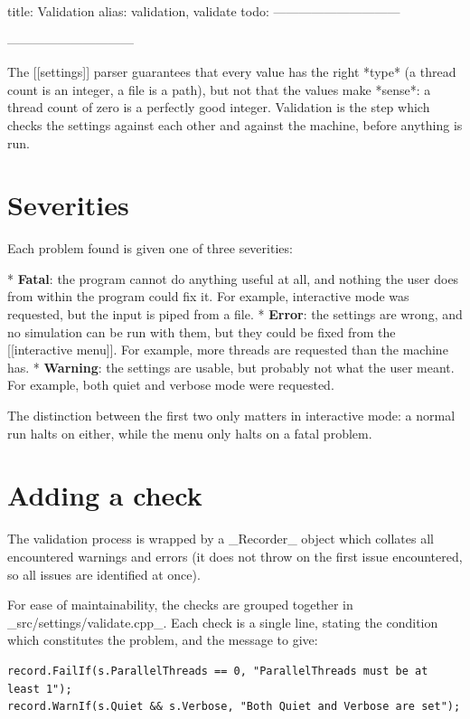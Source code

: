 title: Validation
alias: validation, validate
todo:
------------------------------
\usepackage{listings}
------------------------------

The [[settings]] parser guarantees that every value has the right *type* (a thread count is an integer, a file is a path), but not that the values make *sense*: a thread count of zero is a perfectly good integer. Validation is the step which checks the settings against each other and against the machine, before anything is run.

\section{Severities}

	Each problem found is given one of three severities:

	* \textbf{Fatal}: the program cannot do anything useful at all, and nothing the user does from within the program could fix it. For example, interactive mode was requested, but the input is piped from a file.
	* \textbf{Error}: the settings are wrong, and no simulation can be run with them, but they could be fixed from the [[interactive menu]]. For example, more threads are requested than the machine has.
	* \textbf{Warning}: the settings are usable, but probably not what the user meant. For example, both quiet and verbose mode were requested.

	The distinction between the first two only matters in interactive mode: a normal run halts on either, while the menu only halts on a fatal problem.


\section{Adding a check}

	The validation process is wrapped by a _Recorder_ object which collates all encountered warnings and errors (it does not throw on the first issue encountered, so all issues are identified at once).

	For ease of maintainability, the checks are grouped together in _src/settings/validate.cpp_. Each check is a single line, stating the condition which constitutes the problem, and the message to give:

	\begin{lstlisting}[showstringspaces=false]
record.FailIf(s.ParallelThreads == 0, "ParallelThreads must be at least 1");
record.WarnIf(s.Quiet && s.Verbose, "Both Quiet and Verbose are set");
\end{lstlisting}


